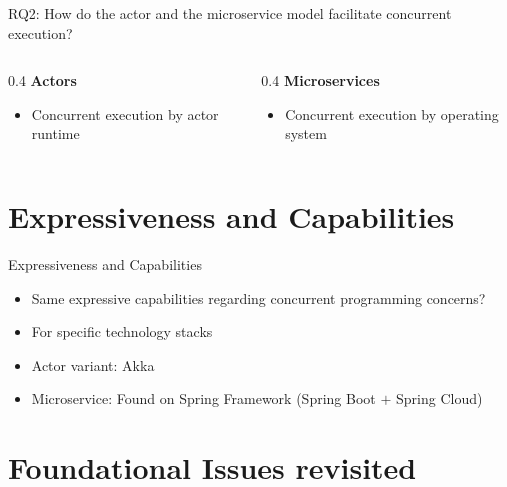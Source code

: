 \documentclass{beamer}
\begin{document}
\begin{frame}{RQ2: How do the actor and the microservice model facilitate concurrent execution?}

\begin{columns}
  \begin{column} {0.4\textwidth} 
    \textbf{Actors}
    \begin{itemize}
      \item Concurrent execution by actor runtime
    \end{itemize}
  \end{column}
  \begin{column} {0.4\textwidth}
    \textbf{Microservices} \\
    \begin{itemize}
      \item Concurrent execution by operating system
    \end{itemize}
  \end{column}
\end{columns}

\end{frame}


\section{Expressiveness and Capabilities}


\begin{frame}{Expressiveness and Capabilities}

\begin{itemize}
  \item Same expressive capabilities regarding concurrent programming concerns?
  \item For specific technology stacks
  \item Actor variant: Akka
  \item Microservice: Found on Spring Framework (Spring Boot $+$ Spring Cloud)
\end{itemize}

\end{frame}


\section{Foundational Issues revisited}
\end{document}

